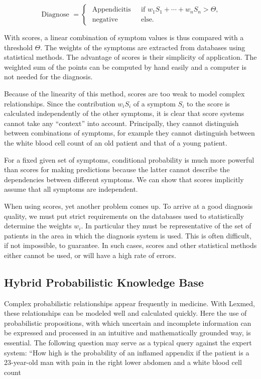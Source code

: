 \documentclass[10pt]{book}
\begin{document}
$$
\text { Diagnose }= \begin{cases}\text { Appendicitis } & \text { if } w_{1} S_{1}+\cdots+w_{n} S_{n}>\Theta, \\ \text { negative } & \text { else. }\end{cases}
$$

With scores, a linear combination of symptom values is thus compared with a threshold $\Theta$. The weights of the symptoms are extracted from databases using statistical methods. The advantage of scores is their simplicity of application. The weighted sum of the points can be computed by hand easily and a computer is not needed for the diagnosis.

Because of the linearity of this method, scores are too weak to model complex relationships. Since the contribution $w_{i} S_{i}$ of a symptom $S_{i}$ to the score is calculated independently of the other symptoms, it is clear that score systems cannot take any ``context'' into account. Principally, they cannot distinguish between combinations of symptoms, for example they cannot distinguish between the white blood cell count of an old patient and that of a young patient.

For a fixed given set of symptoms, conditional probability is much more powerful than scores for making predictions because the latter cannot describe the dependencies between different symptoms. We can show that scores implicitly assume that all symptoms are independent.

When using scores, yet another problem comes up. To arrive at a good diagnosis quality, we must put strict requirements on the databases used to statistically determine the weights $w_{i}$. In particular they must be representative of the set of patients in the area in which the diagnosis system is used. This is often difficult, if not impossible, to guarantee. In such cases, scores and other statistical methods either cannot be used, or will have a high rate of errors.

\subsection{Hybrid Probabilistic Knowledge Base}
Complex probabilistic relationships appear frequently in medicine. With Lexmed, these relationships can be modeled well and calculated quickly. Here the use of probabilistic propositions, with which uncertain and incomplete information can be expressed and processed in an intuitive and mathematically grounded way, is essential. The following question may serve as a typical query against the expert system: ``How high is the probability of an inflamed appendix if the patient is a 23-year-old man with pain in the right lower abdomen and a white blood cell count
\end{document}
